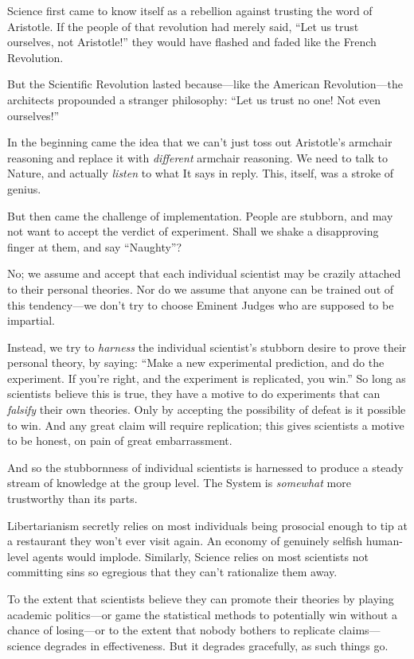 {
 Science first came to know itself as a rebellion against trusting
the word of Aristotle. If the people of that revolution had merely
said, ``Let us trust ourselves, not
Aristotle!'' they would have flashed and faded like
the French Revolution.}

{
 But the Scientific Revolution lasted because---like the American
Revolution---the architects propounded a stranger philosophy:
``Let us trust no one! Not even
ourselves!''}

{
 In the beginning came the idea that we can't just
toss out Aristotle's armchair reasoning and replace it
with \textit{different} armchair reasoning. We need to talk to Nature,
and actually \textit{listen} to what It says in reply. This, itself,
was a stroke of genius.}

{
 But then came the challenge of implementation. People are
stubborn, and may not want to accept the verdict of experiment. Shall
we shake a disapproving finger at them, and say
``Naughty''?}

{
 No; we assume and accept that each individual scientist may be
crazily attached to their personal theories. Nor do we assume that
anyone can be trained out of this tendency---we don't
try to choose Eminent Judges who are supposed to be impartial.}

{
 Instead, we try to \textit{harness} the individual
scientist's stubborn desire to prove their personal
theory, by saying: ``Make a new experimental
prediction, and do the experiment. If you're right, and
the experiment is replicated, you win.'' So long as
scientists believe this is true, they have a motive to do experiments
that can \textit{falsify} their own theories. Only by accepting the
possibility of defeat is it possible to win. And any great claim will
require replication; this gives scientists a motive to be honest, on
pain of great embarrassment.}

{
 And so the stubbornness of individual scientists is harnessed to
produce a steady stream of knowledge at the group level. The System is
\textit{somewhat} more trustworthy than its parts.}

{
 Libertarianism secretly relies on most individuals being prosocial
enough to tip at a restaurant they won't ever visit
again. An economy of genuinely selfish human-level agents would
implode. Similarly, Science relies on most scientists not committing
sins so egregious that they can't rationalize them
away.}

{
 To the extent that scientists believe they can promote their
theories by playing academic politics---or game the statistical methods
to potentially win without a chance of losing---or to the extent that
nobody bothers to replicate claims---science degrades in effectiveness.
But it degrades gracefully, as such things go.}


